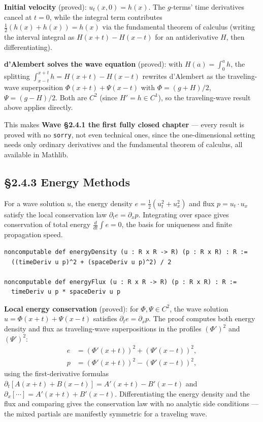 ﻿\documentclass[12pt, a4paper]{article}
\renewcommand{\_}{\origunderscore\allowbreak}
\theoremstyle{definition}
\theoremstyle{plain}
\begin{document}
\textbf{Initial velocity} (proved): $u_t(x,0) = h(x)$. The $g$-terms' time derivatives
cancel at $t=0$, while the integral term contributes $\tfrac{1}{2}(h(x)+h(x)) = h(x)$ via
the fundamental theorem of calculus (writing the interval integral as $H(x+t)-H(x-t)$ for
an antiderivative $H$, then differentiating).

\textbf{d'Alembert solves the wave equation} (proved): with $H(a) = \int_0^a h$, the
splitting $\int_{x-t}^{x+t} h = H(x+t) - H(x-t)$ rewrites d'Alembert as the traveling-wave
superposition $\Phi(x+t) + \Psi(x-t)$ with $\Phi = (g+H)/2$, $\Psi = (g-H)/2$. Both are
$C^2$ (since $H' = h \in C^1$), so the traveling-wave result above applies directly.

This makes \textbf{Wave §2.4.1 the first fully closed chapter} --- every result is proved
with no \texttt{sorry}, not even technical ones, since the one-dimensional setting needs
only ordinary derivatives and the fundamental theorem of calculus, all available in Mathlib.

\subsection{§2.4.3 Energy Methods}

For a wave solution $u$, the energy density $e = \tfrac{1}{2}(u_t^2 + u_x^2)$ and flux
$p = u_t \cdot u_x$ satisfy the local conservation law $\partial_t e = \partial_x p$.
Integrating over space gives conservation of total energy $\frac{d}{dt}\int e = 0$, the
basis for uniqueness and finite propagation speed.

\begin{lstlisting}[caption={Energy density and flux}]
noncomputable def energyDensity (u : R x R -> R) (p : R x R) : R :=
  ((timeDeriv u p)^2 + (spaceDeriv u p)^2) / 2

noncomputable def energyFlux (u : R x R -> R) (p : R x R) : R :=
  timeDeriv u p * spaceDeriv u p
\end{lstlisting}

\textbf{Local energy conservation} (proved): for $\Phi, \Psi \in C^2$, the wave solution
$u = \Phi(x+t) + \Psi(x-t)$ satisfies $\partial_t e = \partial_x p$. The proof computes
both energy density and flux as traveling-wave superpositions in the profiles
$(\Phi')^2$ and $(\Psi')^2$:
\begin{align}
  e &= (\Phi'(x+t))^2 + (\Psi'(x-t))^2, \\
  p &= (\Phi'(x+t))^2 - (\Psi'(x-t))^2,
\end{align}
using the first-derivative formulas
$\partial_t[A(x+t)+B(x-t)] = A'(x+t) - B'(x-t)$ and
$\partial_x[\cdots] = A'(x+t) + B'(x-t)$. Differentiating the energy density and the flux and
comparing gives the conservation law with no analytic side conditions --- the mixed partials
are manifestly symmetric for a traveling wave.
\end{document}
